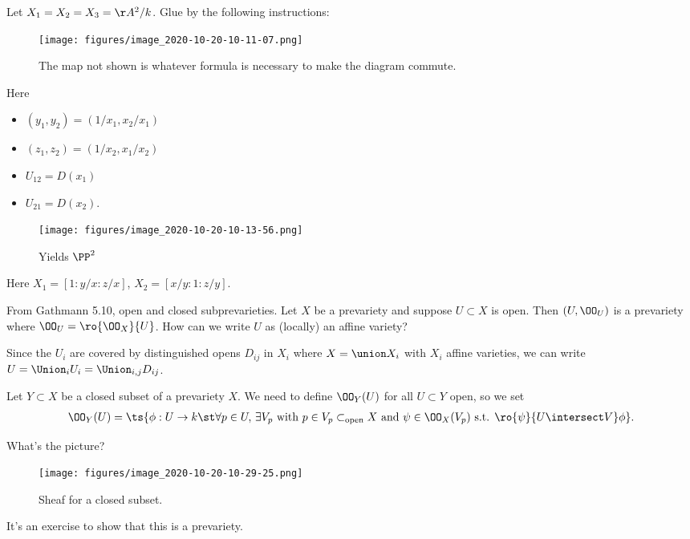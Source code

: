 \begin{example}

Let \(X_1 = X_2 = X_3 = \AA^2/k\). Glue by the following instructions:

\begin{figure}
\centering
\texttt{[image: figures/image\_2020-10-20-10-11-07.png]}
\caption{The map not shown is whatever formula is necessary to make the
diagram commute.}
\end{figure}

Here

\begin{itemize}
\tightlist
\item
  \((y_1, y_2) = (1/x_1, x_2/x_1)\)
\item
  \((z_1, z_2) = (1/x_2, x_1/x_2)\)
\item
  \(U_{12} = D(x_1)\)
\item
  \(U_{21} = D(x_2)\).
\end{itemize}

\begin{figure}
\centering
\texttt{[image: figures/image\_2020-10-20-10-13-56.png]}
\caption{Yields \(\PP^2\)}
\end{figure}

Here \(X_1 = [1: y/x: z/x]\), \(X_2 = [x/y: 1: z/y]\).

\end{example}

\begin{example}

From Gathmann 5.10, open and closed subprevarieties. Let \(X\) be a
prevariety and suppose \(U\subset X\) is open. Then \((U, \OO_U)\) is a
prevariety where \(\OO_U = \ro{\OO_X}{U}\). How can we write \(U\) as
(locally) an affine variety?

Since the \(U_i\) are covered by distinguished opens \(D_{ij}\) in
\(X_i\) where \(X = \union X_i\) with \(X_i\) affine varieties, we can
write \(U = \Union_i U_i = \Union_{i, j} D_{ij}\).

\end{example}

\begin{example}

Let \(Y\subset X\) be a closed subset of a prevariety \(X\). We need to
define \(\OO_Y(U)\) for all \(U\subset Y\) open, so we set
\begin{align*}  
\OO_Y(U) = \ts{\phi: U\to k \st \forall p\in U, \, \exists V_p \text{ with } p\in V_p \subset_{\text{open}} X \text{ and } \psi\in \OO_X(V_p) \text{ s.t. } \ro{\psi}{U\intersect V} \phi  }
.\end{align*}

What's the picture?

\begin{figure}
\centering
\texttt{[image: figures/image\_2020-10-20-10-29-25.png]}
\caption{Sheaf for a closed subset.}
\end{figure}

It's an exercise to show that this is a prevariety.

\end{example}

